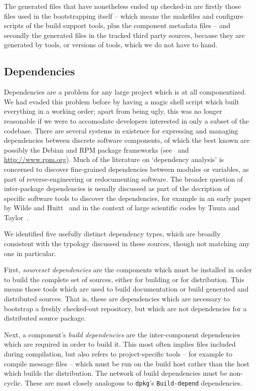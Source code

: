 \documentclass{speauth}
\begin{document}
The generated files that have nonetheless ended up checked-in are
firstly those files used in the bootstrapping itself -- which means
the makefiles and configure scripts of the build support tools, plus
the component metadata files -- and secondly the generated files in
the tracked third party sources, because they are generated by tools,
or versions of tools, which we do not have to hand.

\subsection{Dependencies}
\label{s:deps}

Dependencies are a problem for any large project which is at all
componentized.  We had evaded this problem before by having a magic
shell script which built everything in a working order; apart from
being ugly, this was no longer reasonable if we were to accomodate
developers interested in only a subset of the codebase.  There are
several systems in existence for expressing and managing dependencies
between discrete software components, of which the best known are
possibly the Debian and RPM package frameworks
(see~\cite[ch~7]{debian05} and \url{http://www.rpm.org}).  Much of the
literature on `dependency analysis' is concerned to discover
fine-grained dependencies between modules or variables, as part of
reverse-engineering or redocumenting software.  The broader question of
inter-package dependencies is usually discussed as part of the decription of
specific software tools to discover the dependencies, for example in
an early paper by Wilde and Huitt~\cite{wilde91} and in the context of
large scientific codes by Tuura and Taylor~\cite{tuura01}.

We identified five usefully distinct dependency types, which are
broadly consistent with the typology discussed in these sources,
though not matching any one in particular.

First, \emph{sourceset dependencies} are the components which must be
installed in order to build the complete set of sources, either for
building or for distribution.  This means those tools which are used
to build documentation or build generated and distributed sources.
That is, these are dependencies which are necessary to bootstrap a
freshly checked-out repository, but which are not dependencies for a
distributed source package.

Next, a component's \emph{build dependencies} are the inter-component
dependencies 
which are required in order to build it.  This most often implies
files included during compilation, but also refers to project-specific
tools -- for example to compile message files -- which must be run on
the build host rather than the host which builds the distribution.
The network of build dependencies must be non-cyclic.  These are most
closely analogous to \texttt{dpkg}'s \texttt{Build-depend} dependencies.
\end{document}
